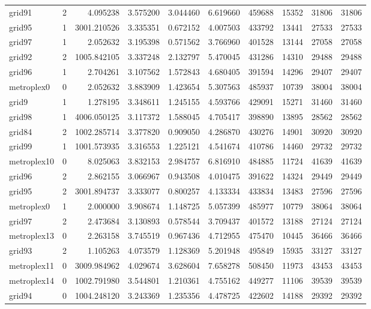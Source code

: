 \begin{longtable}{|l|r|r|r|r|r|r|r|r|r|}
grid91 & 2 & 4.095238 & 3.575200 & 3.044460 & 6.619660 & 459688 & 15352 & 31806 & 31806 \\
grid95 & 1 & 3001.210526 & 3.335351 & 0.672152 & 4.007503 & 433792 & 13441 & 27533 & 27533 \\
grid97 & 1 & 2.052632 & 3.195398 & 0.571562 & 3.766960 & 401528 & 13144 & 27058 & 27058 \\
grid92 & 2 & 1005.842105 & 3.337248 & 2.132797 & 5.470045 & 431286 & 14310 & 29488 & 29488 \\
grid96 & 1 & 2.704261 & 3.107562 & 1.572843 & 4.680405 & 391594 & 14296 & 29407 & 29407 \\
metroplex0 & 0 & 2.052632 & 3.883909 & 1.423654 & 5.307563 & 485937 & 10739 & 38004 & 38004 \\
grid9 & 1 & 1.278195 & 3.348611 & 1.245155 & 4.593766 & 429091 & 15271 & 31460 & 31460 \\
grid98 & 1 & 4006.050125 & 3.117372 & 1.588045 & 4.705417 & 398890 & 13895 & 28562 & 28562 \\
grid84 & 2 & 1002.285714 & 3.377820 & 0.909050 & 4.286870 & 430276 & 14901 & 30920 & 30920 \\
grid99 & 1 & 1001.573935 & 3.316553 & 1.225121 & 4.541674 & 410786 & 14460 & 29732 & 29732 \\
metroplex10 & 0 & 8.025063 & 3.832153 & 2.984757 & 6.816910 & 484885 & 11724 & 41639 & 41639 \\
grid96 & 2 & 2.862155 & 3.066967 & 0.943508 & 4.010475 & 391622 & 14324 & 29449 & 29449 \\
grid95 & 2 & 3001.894737 & 3.333077 & 0.800257 & 4.133334 & 433834 & 13483 & 27596 & 27596 \\
metroplex0 & 1 & 2.000000 & 3.908674 & 1.148725 & 5.057399 & 485977 & 10779 & 38064 & 38064 \\
grid97 & 2 & 2.473684 & 3.130893 & 0.578544 & 3.709437 & 401572 & 13188 & 27124 & 27124 \\
metroplex13 & 0 & 2.263158 & 3.745519 & 0.967436 & 4.712955 & 475470 & 10445 & 36466 & 36466 \\
grid93 & 2 & 1.105263 & 4.073579 & 1.128369 & 5.201948 & 495849 & 15935 & 33127 & 33127 \\
metroplex11 & 0 & 3009.984962 & 4.029674 & 3.628604 & 7.658278 & 508450 & 11973 & 43453 & 43453 \\
metroplex14 & 0 & 1002.791980 & 3.544801 & 1.210361 & 4.755162 & 449277 & 11106 & 39539 & 39539 \\
grid94 & 0 & 1004.248120 & 3.243369 & 1.235356 & 4.478725 & 422602 & 14188 & 29392 & 29392 \\

\end{longtable}
